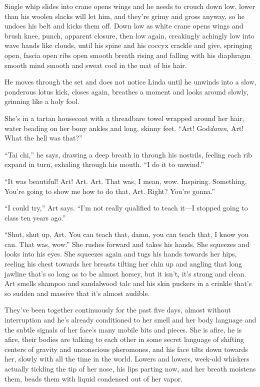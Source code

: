 Single whip slides into crane opens wings and he needs to crouch
down low, lower than his woolen slacks will let him, and they’re
grimy and gross anyway, so he undoes his belt and kicks them off.
Down low as white crane opens wings and brush knee, punch, apparent
closure, then low again, creakingly achingly low into wave hands
like clouds, until his spine and his coccyx crackle and give,
springing open, fascia open ribs open smooth breath rising and
falling with his diaphragm smooth mind smooth and sweat cool in the
mat of his hair.

He moves through the set and does not notice Linda until he unwinds
into a slow, ponderous lotus kick, closes again, breathes a moment
and looks around slowly, grinning like a holy fool.

She’s in a tartan housecoat with a threadbare towel wrapped around
her hair, water beading on her bony ankles and long, skinny feet.
“Art! God\emph{damn}, Art! What the hell was that?”

“Tai chi,” he says, drawing a deep breath in through his nostrils,
feeling each rib expand in turn, exhaling through his mouth. “I do
it to unwind.”

“It was beautiful! Art! Art. Art. That was, I mean, wow. Inspiring.
Something. You’re going to show me how to do that, Art. Right?
You’re gonna.”

“I could try,” Art says. “I’m not really qualified to teach it—I
stopped going to class ten years ago.”

“Shut, shut up, Art. You can teach that, damn, you can teach that,
I know you can. That was, wow.” She rushes forward and takes his
hands. She squeezes and looks into his eyes. She squeezes again and
tugs his hands towards her hips, reeling his chest towards her
breasts tilting her chin up and angling that long jawline that’s so
long as to be almost horsey, but it isn’t, it’s strong and clean.
Art smells shampoo and sandalwood talc and his skin puckers in a
crinkle that’s so sudden and massive that it’s almost audible.

They’ve been together continuously for the past five days, almost
without interruption and he’s already conditioned to her smell and
her body language and the subtle signals of her face’s many mobile
bits and pieces. She is afire, he is afire, their bodies are
talking to each other in some secret language of shifting centers
of gravity and unconscious pheromones, and his face tilts down
towards her, slowly with all the time in the world. Lowers and
lowers, week-old whiskers actually tickling the tip of her nose,
his lips parting now, and her breath moistens them, beads them with
liquid condensed out of her vapor.

